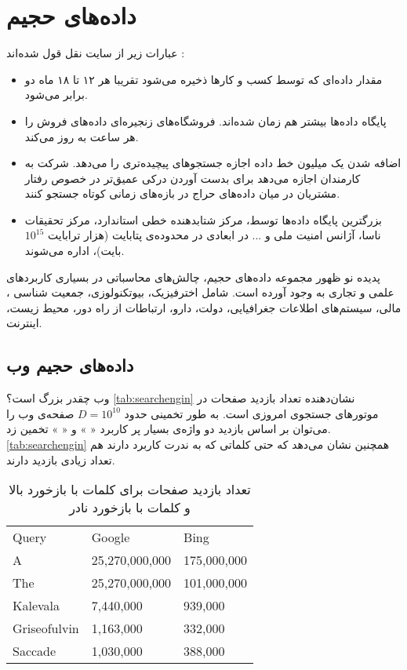 \section{داده‌های حجیم}
عبارات زیر از سایت 
نقل قول شده‌اند
\cite{site_iw}
:

\begin{itemize}
\item
مقدار داده‌ای که توسط کسب و کارها ذخیره می‌شود تقریبا هر ۱۲ تا ۱۸ ماه دو برابر می‌شود.
\item
پایگاه داده‌ها بیشتر هم ‌زمان شده‌اند. فروشگاه‌های زنجیره‌ای 
داده‌های فروش را هر ساعت به روز می‌کند.
\item
اضافه شدن یک میلیون خط داده اجازه جستجوهای پیچیده‌تری را می‌دهد. شرکت 
به کارمندان اجازه می‌دهد برای بدست آوردن درکی عمیق‌تر در خصوص رفتار مشتریان در میان داده‌های حراج در بازه‌های زمانی کوتاه جستجو کنند.
\item
بزرگترین پایگاه داده‌ها توسط، مرکز شتابدهنده خطی استاندارد، مرکز تحقیقات ناسا، آژانس امنیت ملی و ... در ابعادی در محدوده‌ی پتابایت (هزار ترابایت 
$10^{15}$
بایت)، اداره می‌شوند.
\end{itemize}

پدیده نو ظهور مجموعه‌ داده‌های حجیم، چالش‌های محاسباتی در بسیاری کاربردهای علمی و تجاری به وجود آورده است. شامل اخترفیزیک، بیوتکنولوزی، جمعیت شناسی%
، مالی، سیستم‌های اطلاعات جغرافیایی، دولت، دارو، ارتباطات از راه دور، محیط زیست، اینترنت.

\subsection{داده‌های حجیم وب}

وب چقدر بزرگ است؟  
\autoref{tab:searchengin}
نشان‌دهنده تعداد بازدید صفحات در موتورهای جستجوی امروزی است. به طور تخمینی حدود 
$D = 10^{10}$
صفحه‌ی وب را می‌توان بر اساس بازدید دو واژه‌ی بسیار پر کاربرد «
» و «
» تخمین زد. 
\autoref{tab:searchengin}
 همچنین نشان می‌دهد که حتی کلماتی که به ندرت کاربرد دارند هم تعداد زیادی بازدید دارند.

\begin{table}[h]
\caption{
تعداد بازدید صفحات برای کلمات با بازخورد بالا و کلمات با بازخورد نادر
}
\centering
\bigskip
\begin{latin}
\begin{tabular}{lll}
\hline
Query        & Google         & Bing        \\ \hhline{===}
A            & 25,270,000,000 & 175,000,000 \\
The          & 25,270,000,000 & 101,000,000 \\
Kalevala     & 7,440,000      & 939,000     \\
Griseofulvin & 1,163,000      & 332,000     \\
Saccade      & 1,030,000      & 388,000     \\
\hline
\end{tabular}
\end{latin}
\label{tab:searchengin}
\end{table}


